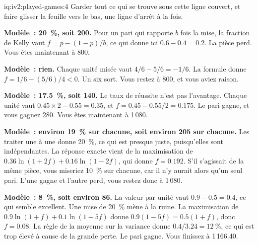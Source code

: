 \begin{solution}{iq:iv2:played-games:4}
Garder tout ce qui se trouve sous cette ligne couvert, et faire glisser la feuille vers le bas, une ligne d'arrêt à la fois.

\ivstop
\textbf{Modèle~: 20~\%, soit 200.} Pour un pari qui rapporte $b$ fois la mise, la fraction de Kelly vaut $f = p - (1 - p)/b$, ce qui donne ici $0.6 - 0.4 = 0.2$. La pièce perd. Vous êtes maintenant à 800.

\ivstop
\textbf{Modèle~: rien.} Chaque unité misée vaut $4/6 - 5/6 = -1/6$. La formule donne $f = 1/6 - (5/6)/4 < 0$. Un six sort. Vous restez à 800, et vous aviez raison.

\ivstop
\textbf{Modèle~: 17.5~\%, soit 140.} Le taux de réussite n'est pas l'avantage. Chaque unité vaut $0.45 \times 2 - 0.55 = 0.35$, et $f = 0.45 - 0.55/2 = 0.175$. Le pari gagne, et vous gagnez 280. Vous êtes maintenant à 1\,080.

\ivstop
\textbf{Modèle~: environ 19~\% sur chacune, soit environ 205 sur chacune.} Les traiter une à une donne 20~\%, ce qui est presque juste, puisqu'elles sont indépendantes. La réponse exacte vient de la maximisation de $0.36\ln(1 + 2f) + 0.16\ln(1 - 2f)$, qui donne $f = 0.192$. S'il s'agissait de la même pièce, vous miseriez 10~\% sur chacune, car il n'y aurait alors qu'un seul pari. L'une gagne et l'autre perd, vous restez donc à 1\,080.

\ivstop
\textbf{Modèle~: 8~\%, soit environ 86.} La valeur par unité vaut $0.9 - 0.5 = 0.4$, ce qui semble excellent. Une mise de 20~\% mène à la ruine. La maximisation de $0.9\ln(1 + f) + 0.1\ln(1 - 5f)$ donne $0.9(1 - 5f) = 0.5(1 + f)$, donc $f = 0.08$. La règle de la moyenne sur la variance donne $0.4/3.24 = 12~\%$, ce qui est trop élevé à cause de la grande perte. Le pari gagne. Vous finissez à 1\,166.40.


\end{solution}
